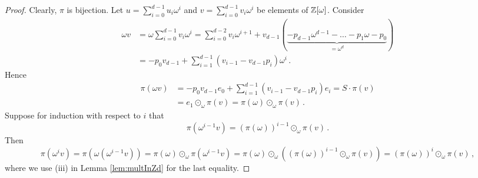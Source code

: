 \begin{proof}
Clearly, $\pi$ is bijection. Let $u=\sum_{i=0}^{d-1} u_i \omega^i$ and $v=\sum_{i=0}^{d-1} v_i \omega^i$ be elements of $\mathbb{Z}[\omega]$. Consider
\begin{align*}
\omega v&=\omega \sum_{i=0}^{d-1} v_i \omega^i = \sum_{i=0}^{d-2} v_i \omega^{i+1} + v_{d-1}(\underbrace{-p_{d-1}\omega^{d-1}- \dots -p_1\omega-p_0}_{=\omega^d}) \\
&= -p_0 v_{d-1} + \sum_{i=1}^{d-1} (v_{i-1}- v_{d-1} p_i) \omega^i\,.
\end{align*}
Hence
\begin{align*}
\pi(\omega v)&= -p_0 v_{d-1} e_0 + \sum_{i=1}^{d-1} (v_{i-1}- v_{d-1} p_i) e_i = S \cdot \pi(v) \\
    &=e_1\odot_\omega \pi(v)=\pi(\omega)\odot_\omega\pi(v)\,.
\end{align*}
Suppose for induction with respect to $i$ that
$$
\pi(\omega^{i-1} v)=(\pi(\omega))^{i-1}\odot_\omega \pi(v)\,.
$$ 
Then
$$
\pi(\omega^{i}v)=\pi(\omega(\omega^{i-1} v))=\pi(\omega)\odot_\omega\pi(\omega^{i-1} v)=\pi(\omega)\odot_\omega\left((\pi(\omega))^{i-1}\odot_\omega \pi(v)\right)=(\pi(\omega))^{i}\odot_\omega \pi(v)\,,
$$
where we use (iii) in Lemma \ref{lem:multInZd} for the last equality.


\end{proof}
